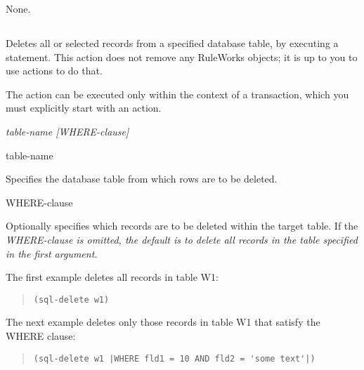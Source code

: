 {{\Format


\Arguments

None.

\subsection{}

Deletes all or selected records from a specified database table, by
executing a  statement. This action does not remove
any RuleWorks objects; it is up to you to use  actions to
do that.

The  action can be executed only within the context
of a  transaction, which you must explicitly start
with an  action.

\Format

 \it{table-name} [\it{WHERE-clause}]

\begin{arguments}

\item[table-name]

  Specifies the database table from which rows are to be deleted.

\item[WHERE-clause]

  Optionally specifies which records are to be deleted within the
  target table. If the \it{WHERE-clause} is omitted, the default is to
  delete all records in the table specified in the first argument.
\end{arguments}

\Example

The first example deletes all records in table W1:

\begin{quote}
\begin{verbatim}
(sql-delete w1)
\end{verbatim}
\end{quote}

The next example deletes only those records in table W1 that
satisfy the WHERE clause:

\begin{quote}
\begin{verbatim}
(sql-delete w1 |WHERE fld1 = 10 AND fld2 = 'some text'|)
\end{verbatim}
\end{quote}

}}
